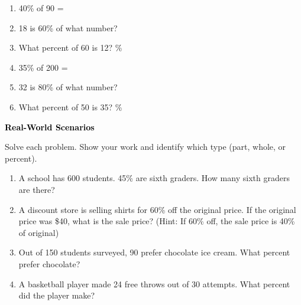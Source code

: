 \documentclass[12pt, letterpaper, fleqn]{article}
\newcommand{\blank}{\underline{\hspace{2.2cm}}}
\begin{document}
\vspace{3mm}

\begin{enumerate}[itemsep=2.4cm, leftmargin=0.6cm]

\item 40\% of 90 = \blank

\item 18 is 60\% of what number? \blank

\item What percent of 60 is 12? \blank\; \%

\item 35\% of 200 = \blank

\item 32 is 80\% of what number? \blank

\item What percent of 50 is 35? \blank\; \%

\end{enumerate}

\newpage

\begin{tcolorbox}[colback=customteal!20]
\large\textcolor{black}{\textbf{Real-World Scenarios}}
\end{tcolorbox}

\noindent
Solve each problem. Show your work and identify which type (part, whole, or percent).

\vspace{3mm}

\begin{enumerate}[itemsep=2cm, leftmargin=0.6cm]

\item A school has 600 students. 45\% are sixth graders. How many sixth graders are there?

\vspace{1.8cm}

\item A discount store is selling shirts for 60\% off the original price. If the original price was \$40, what is the sale price? (Hint: If 60\% off, the sale price is 40\% of original)

\vspace{1.8cm}

\item Out of 150 students surveyed, 90 prefer chocolate ice cream. What percent prefer chocolate?

\vspace{1.8cm}

\item A basketball player made 24 free throws out of 30 attempts. What percent did the player make?

\vspace{1.8cm}

\end{enumerate}
\end{document}
